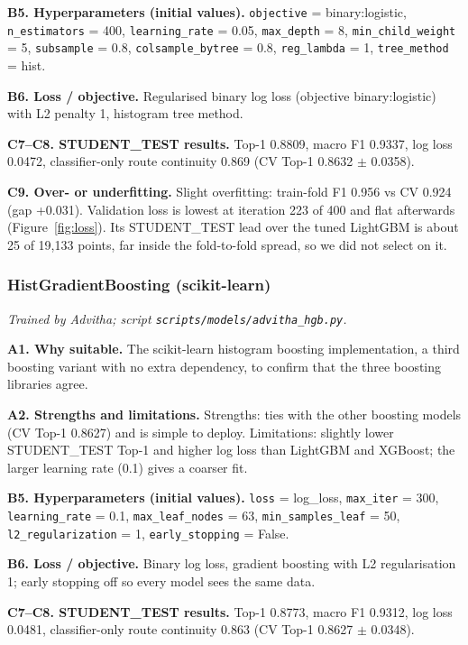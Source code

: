 \documentclass[11pt,a4paper]{article}
\begin{document}
\textbf{B5. Hyperparameters (initial values).} \texttt{objective} = binary:logistic, \texttt{n\_estimators} = 400, \texttt{learning\_rate} = 0.05, \texttt{max\_depth} = 8, \texttt{min\_child\_weight} = 5, \texttt{subsample} = 0.8, \texttt{colsample\_bytree} = 0.8, \texttt{reg\_lambda} = 1, \texttt{tree\_method} = hist.

\textbf{B6. Loss / objective.} Regularised binary log loss (objective binary:logistic) with L2 penalty 1, histogram tree method.

\textbf{C7--C8. STUDENT\_TEST results.} Top-1 0.8809, macro F1 0.9337, log loss 0.0472, classifier-only route continuity 0.869 (CV Top-1 0.8632 $\pm$ 0.0358).

\textbf{C9. Over- or underfitting.} Slight overfitting: train-fold F1 0.956 vs CV 0.924 (gap +0.031). Validation loss is lowest at iteration 223 of 400 and flat afterwards (Figure~\ref{fig:loss}). Its STUDENT\_TEST lead over the tuned LightGBM is about 25 of 19,133 points, far inside the fold-to-fold spread, so we did not select on it.
\subsubsection{HistGradientBoosting (scikit-learn)}
\textit{Trained by Advitha; script \texttt{scripts/models/advitha\_hgb.py}.}

\textbf{A1. Why suitable.} The scikit-learn histogram boosting implementation, a third boosting variant with no extra dependency, to confirm that the three boosting libraries agree.

\textbf{A2. Strengths and limitations.} Strengths: ties with the other boosting models (CV Top-1 0.8627) and is simple to deploy. Limitations: slightly lower STUDENT\_TEST Top-1 and higher log loss than LightGBM and XGBoost; the larger learning rate (0.1) gives a coarser fit.

\textbf{B5. Hyperparameters (initial values).} \texttt{loss} = log\_loss, \texttt{max\_iter} = 300, \texttt{learning\_rate} = 0.1, \texttt{max\_leaf\_nodes} = 63, \texttt{min\_samples\_leaf} = 50, \texttt{l2\_regularization} = 1, \texttt{early\_stopping} = False.

\textbf{B6. Loss / objective.} Binary log loss, gradient boosting with L2 regularisation 1; early stopping off so every model sees the same data.

\textbf{C7--C8. STUDENT\_TEST results.} Top-1 0.8773, macro F1 0.9312, log loss 0.0481, classifier-only route continuity 0.863 (CV Top-1 0.8627 $\pm$ 0.0348).
\end{document}
